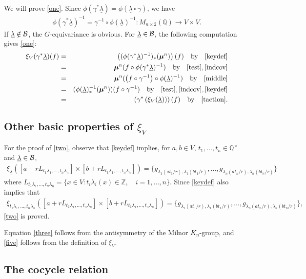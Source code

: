 \documentclass[12pt,amstex,amssymb]{article}
\theoremstyle{plain}
\theoremstyle{definition}
\def\cB{{\cal B}}
\def\Z{{\mathbb Z}}
\def\Q{{\mathbb Q}}
\def\ulambda {{\underline{\lambda}}}
\newcommand{\be}{\begin{eqnarray*}}
\newcommand{\ee}{\end{eqnarray*}}
\newcommand{\bea}{\begin{eqnarray}}
\newcommand{\eea}{\end{eqnarray}}
\begin{document}
We will prove \eqref{one}.
Since $\phi(\gamma^\ast \ulambda) = \phi(\ulambda \circ \gamma)$,
we have 
\bea \label{middle}
\phi(\gamma^\ast \ulambda)^{-1} = \gamma^{-1} \circ \phi(\ulambda)^{-1}: M_{n\times 2}(\Q) \to V \times V.
\eea
If $\ulambda \notin\cB$, the $G$-equivariance is obvious.
For $\ulambda \in \cB$, the following computation gives \eqref{one}:
\be 
\xi_V({\gamma^\ast \ulambda}) (f)  &=& \left( (\phi(\gamma^\ast \ulambda)^{-1} )_\ast ({\bm\mu}^n) \right) (f) \quad \text{by} \quad \eqref{keydef}\\
&=& {\bm\mu}^n (f \circ \phi(\gamma^\ast \ulambda)^{-1})  \quad \text{by} \quad \eqref{test}, \eqref{indcov}\\
&=& {\bm\mu}^n ( \left(f \circ \gamma^{-1}\right) \circ \phi(\ulambda)^{-1})  \quad \text{by} \quad \eqref{middle}  \\
&=& (\phi(\ulambda)^{-1}_\ast({\bm\mu}^n)) (f \circ \gamma^{-1}) \quad \text{by} \quad  \eqref{test}, \eqref{indcov},\eqref{keydef} \\
 &=&\left( \gamma^\ast \left( \xi_V(\ulambda)\right)\right)(f) \quad \text{by} \quad \eqref{taction}.
\ee


\subsection{Other basic properties of $\xi_V$}
For the proof of \eqref{two}, observe that \eqref{keydef} implies, for $a,b \in V$, $t_1, \ldots, t_n \in \Q^\times$ and $\ulambda \in \cB$, 
\be
\xi_\ulambda ([a+rL_{t_1\lambda_1, \ldots, t_n \lambda_n}]\times [b+rL_{t_1\lambda_1, \ldots, t_n \lambda_n}])=\{g_{\lambda_1(at_1/r), \lambda_1(bt_1/r)}, \ldots,g_{\lambda_n(at_n/r), \lambda_n(bt_n/r)}  \} 
\ee
where $
L_{t_1\lambda_1, \ldots, t_n \lambda_n}=\{x \in V : t_i\lambda_i(x) \in \Z, \quad i=1, \ldots,n \}.$
Since \eqref{keydef} also implies that
\be
\xi_{t_1\lambda_1, \ldots, t_n \lambda_n} ([a+rL_{t_1\lambda_1, \ldots, t_n \lambda_n}]\times [b+rL_{t_1\lambda_1, \ldots, t_n \lambda_n}])=\{g_{\lambda_1(at_1/r), \lambda_1(bt_1/r)}, \ldots,g_{\lambda_n(at_n/r), \lambda_n(bt_n/r)}  \},
\ee
\eqref{two} is proved.

\noindent Equation \eqref{three} follows from the antisymmetry of the Milnor $K_n$-group, and  \eqref{five} follows from the  definition of $\xi_V$.



\subsection{The cocycle relation}
\end{document}
